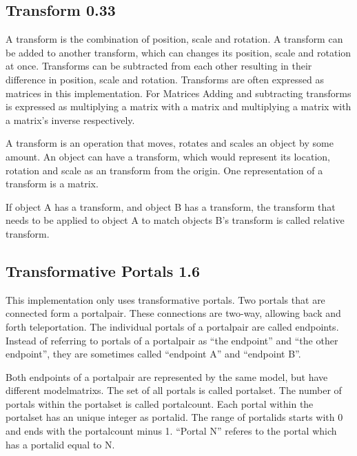 \subsection{Transform 0.33}
A transform is the combination of position, scale and rotation. A transform can be added to another transform, which can changes its position, scale and rotation at once. Transforms can be subtracted from each other resulting in their difference in position, scale and rotation. Transforms are often expressed as matrices in this implementation. For Matrices Adding and subtracting transforms is expressed as multiplying a matrix with a matrix and multiplying a matrix with a matrix's inverse respectively.


A transform is an operation that moves, rotates and scales an object by some amount. An object can have a transform, which would represent its location, rotation and scale as an transform from the origin. One representation of a transform is a matrix.

If object A has a transform, and object B has a transform, the transform that needs to be applied to object A to match objects B's transform is called relative transform.



\subsection{Transformative Portals 1.6}
This implementation only uses transformative portals.  Two portals  that are connected form a \gls{portalpair}. These connections are two-way, allowing back and forth teleportation. The individual portals of a \gls{portalpair} are called \glspl{endpoint}. Instead of referring to portals of a \gls{portalpair} as \enquote{the \gls{endpoint}} and \enquote{the other \gls{endpoint}}, they are sometimes called \enquote{\gls{endpoint} A} and \enquote{\gls{endpoint} B}.

Both \glspl{endpoint} of a \gls{portalpair} are represented by the same model, but have different \glspl{modelmatrix}. The set of all portals is called \gls{portalset}. The number of portals within the \gls{portalset} is called \gls{portalcount}. Each portal within the \gls{portalset} has an unique integer as \gls{portalid}. The range of \glspl{portalid} starts with 0 and ends with the \gls{portalcount} minus 1. \enquote{Portal N} referes to the portal which has a \gls{portalid} equal to N.

